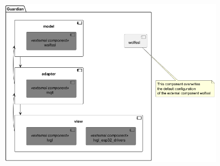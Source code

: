 \begin{figure}
	\centering
	\includegraphics[width=1\textwidth]{abbildungen/Diagramme/components.png}
	\caption{}
	\label{Fig:uml-classes-python}
\end{figure}


